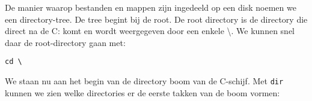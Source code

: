 De manier waarop bestanden en mappen zijn ingedeeld op een disk noemen we een directory-tree. De tree begint bij de root. De root directory is de directory die direct na de C: komt en wordt weergegeven door een enkele \textbackslash. We kunnen snel daar de root-directory gaan met:
\begin{lstlisting}[style=DOS]
cd \
\end{lstlisting}
We staan nu aan het begin van de directory boom van de C-schijf. Met \texttt{dir} kunnen we zien welke directories er de eerste takken van de boom vormen:

\begin{minipage}[t]{\linewidth}
\raggedright
{}
\end{minipage}

